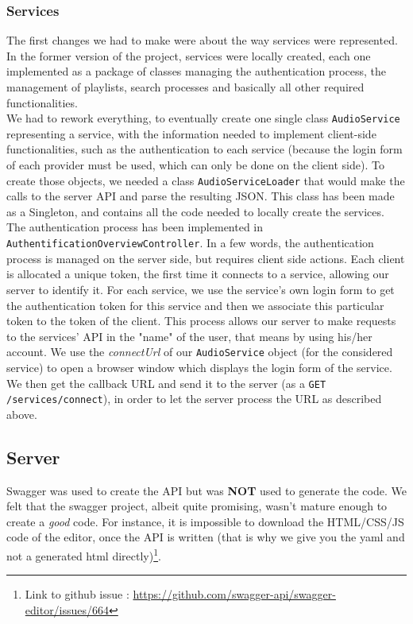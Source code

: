 \documentclass{report}
\begin{document}
{\subsubsection{Services}
The first changes we had to make were about the way services were represented. In the former version of the project, services were locally created, each one implemented as a package of classes managing the authentication process, the management of playlists, search processes and basically all other required functionalities.\\ We had to rework everything, to eventually create one single class \texttt{AudioService} representing a service, with the information needed to implement client-side functionalities, such as the authentication to each service (because the login form of each provider must be used, which can only be done on the client side). To create those objects, we needed a class \texttt{AudioServiceLoader} that would make the calls to the server API and parse the resulting JSON. This class has been made as a Singleton, and contains all the code needed to locally create the services.\\
The authentication process has been implemented in \texttt{AuthentificationOverviewController}. In a few words, the authentication process is managed on the server side, but requires client side actions. Each client is allocated a unique token, the first time it connects to a service, allowing our server to identify it. For each service, we use the service's own login form to get the authentication token for this service and then we associate this particular token to the token of the client. This process allows our server to make requests to the services' API in the "name" of the user, that means by using his/her account. 
 We use the \textit{connectUrl} of our \texttt{AudioService} object (for the considered service) to open a browser window which displays the login form of the service. We then get the callback URL and send it to the server (as a \texttt{GET /services/connect}), in order to let the server process the URL as described above.
 
\subsection{Server}

Swagger was used to create the API but was \textbf{NOT} used to generate the code. We felt that the swagger project, albeit quite promising, wasn't mature enough to create a \textit{good} code. For instance, it is impossible to download the HTML/CSS/JS code of the editor, once the API is written (that is why we give you the yaml and not a generated html directly)\footnote{Link to github issue : \url{https://github.com/swagger-api/swagger-editor/issues/664}}.

}
\end{document}
